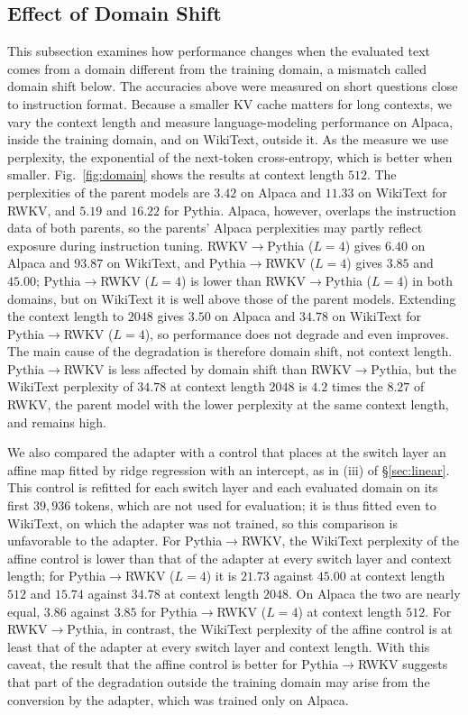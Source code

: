 \documentclass[conference]{IEEEtran}
\newcommand{\figref}[1]{Fig.~\ref{#1}}
\newcommand{\RtoP}{RWKV$\to$\allowbreak Pythia}
\newcommand{\PtoR}{Pythia$\to$\allowbreak RWKV}
\newcommand{\RtoPL}[1]{\RtoP{} ($L{=}#1$)}
\newcommand{\PtoRL}[1]{\PtoR{} ($L{=}#1$)}
\begin{document}
\subsection{Effect of Domain Shift}\label{sec:domain}
This subsection examines how performance changes when the evaluated text comes from a domain different from the training domain, a
mismatch called domain shift below.
The accuracies above were measured on short questions close to instruction format. Because a smaller KV cache matters for long
contexts, we vary the context length and measure language-modeling performance on Alpaca, inside the training domain, and on
WikiText, outside it.
As the measure we use perplexity, the exponential of the next-token cross-entropy, which is better when smaller.
\figref{fig:domain} shows the results at context length $512$. The perplexities of the parent models are $3.42$ on Alpaca and $11.33$
on WikiText for RWKV, and $5.19$ and $16.22$ for Pythia. Alpaca, however, overlaps the instruction data of both parents, so
the parents' Alpaca perplexities may partly reflect exposure during instruction tuning.
\RtoPL{4} gives $6.40$ on Alpaca and $93.87$ on WikiText, and \PtoRL{4} gives $3.85$ and $45.00$; \PtoRL{4} is lower than \RtoPL{4} in
both domains, but on WikiText it is well above those of the parent models.
Extending the context length to $2048$ gives $3.50$ on Alpaca and $34.78$ on WikiText for \PtoRL{4}, so performance does not degrade
and even improves.
The main cause of the degradation is therefore domain shift, not context length. \PtoR{} is less affected by domain shift than \RtoP{},
but the WikiText perplexity of $34.78$ at context length $2048$ is $4.2$ times the $8.27$ of RWKV, the parent model with the lower perplexity at the same
context length, and remains high.

We also compared the adapter with a control that places at the switch layer an affine map fitted by ridge regression with an
intercept, as in (iii) of \S\ref{sec:linear}. This control is refitted for each switch layer and each evaluated domain on its first
$39{,}936$ tokens, which are not used for evaluation; it is thus fitted even to WikiText, on which the adapter was not trained, so this comparison
is unfavorable to the adapter. For \PtoR{}, the WikiText perplexity of the affine control is lower than that of the adapter at every switch
layer and context length; for \PtoRL{4} it is $21.73$ against $45.00$ at context length $512$ and $15.74$ against $34.78$ at context
length $2048$. On Alpaca the two are nearly equal, $3.86$ against $3.85$ for \PtoRL{4} at context length $512$. For \RtoP{}, in
contrast, the WikiText perplexity of the affine control is at least that of the adapter at every switch layer and context length.
With this caveat, the result that the affine control is better for \PtoR{} suggests that part of the degradation outside the training domain may arise from the conversion by the adapter,
which was trained only on Alpaca.
\end{document}
